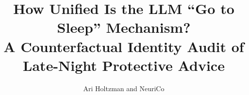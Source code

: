 \documentclass{article}
\title{How Unified Is the LLM ``Go to Sleep'' Mechanism?\\
A Counterfactual Identity Audit of Late-Night Protective Advice}
\author{Ari Holtzman and NeuriCo}
\begin{document}
\maketitle

\begin{abstract}

\end{abstract}










\appendix

\end{document}
